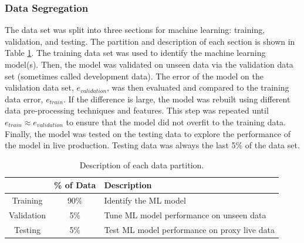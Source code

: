 \subsubsection{Data Segregation}
The data set was split into three sections for machine learning: training, validation, and testing.  The partition and description of each section is shown in Table \ref{tab:08datapart}. The training data set was used to identify the machine learning model(s).  Then, the model was validated on unseen data via the validation data set (sometimes called development data).  The error of the model on the validation data set, $e_{validation}$, was then evaluated and compared to the training data error, $e_{train}$.  If the difference is large, the model was rebuilt using different data pre-processing techniques and features. This step was repeated until $e_{train} \approx e_{validation}$ to ensure that the model did not overfit to the training data. Finally, the model was tested on the testing data to explore the performance of the model in live production.  Testing data was always the last 5\% of the data set.
\begin{table}[h]
    \centering
    {
    \begin{tabular}{ c | c | p{9cm}}
                            & \% of Data        &  Description \\
        \hline
        Training            &  90\%             
        &  Identify the ML model        \\
        
        Validation          &  5\%              
        &  Tune ML model performance on unseen data         \\
        
        Testing             &  5\%             
        &  Test ML model performance on proxy live data       \\     
    \end{tabular}}
    \caption{Description of each data partition.}
    \label{tab:08datapart}
\end{table}
